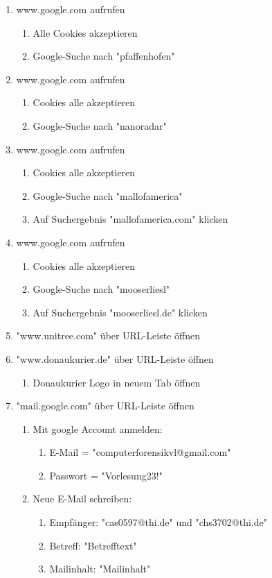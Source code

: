\begin{enumerate}
\item  www.google.com aufrufen
	\begin{enumerate}[label*=\arabic*.]
	\item Alle Cookies akzeptieren 
	\item Google-Suche nach "pfaffenhofen"
	\end{enumerate}
\item www.google.com aufrufen
	\begin{enumerate}[label*=\arabic*.]
	\item Cookies alle akzeptieren 
	\item Google-Suche nach "nanoradar" 
	\end{enumerate}
\item www.google.com aufrufen
	\begin{enumerate}[label*=\arabic*.]
	\item Cookies alle akzeptieren 
	\item Google-Suche nach "mallofamerica"
	\item Auf Suchergebnis "mallofamerica.com" klicken
	\end{enumerate}
\item www.google.com aufrufen
	\begin{enumerate}[label*=\arabic*.]
	\item Cookies alle akzeptieren 
	\item Google-Suche nach "mooserliesl"
	\item Auf Suchergebnis "mooserliesl.de" klicken
	\end{enumerate}
\item "www.unitree.com" über URL-Leiste öffnen
\item "www.donaukurier.de" über URL-Leiste öffnen
	\begin{enumerate}[label*=\arabic*.]
	\item Donaukurier Logo in neuem Tab öffnen
	\end{enumerate}
\item "mail.google.com" über URL-Leiste öffnen
	\begin{enumerate}[label*=\arabic*.]
	\item Mit google Account anmelden: 
			\begin{enumerate}[label*=\arabic*.]
			\item E-Mail = "computerforensikvl@gmail.com"
			\item Passwort = "Vorlesung23!"
			\end{enumerate}
	\item Neue E-Mail schreiben:
			\begin{enumerate}[label*=\arabic*.]
			\item Empfänger: "cas0597@thi.de" und "chs3702@thi.de"
			\item Betreff: "Betrefftext"
			\item Mailinhalt: "Mailinhalt"
			\end{enumerate}			
	\end{enumerate}
\end{enumerate}

